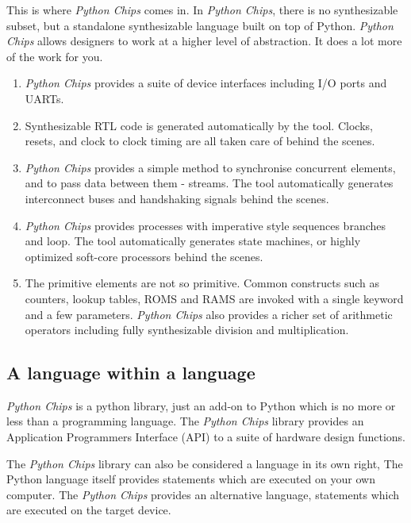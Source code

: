 \documentclass[letterpaper,10pt,english]{manual}
\begin{document}
This is where \emph{Python Chips} comes in. In \emph{Python Chips}, there is no
synthesizable subset, but a standalone synthesizable language built on top
of Python. \emph{Python Chips} allows designers to work at a higher level of
abstraction. It does a lot more of the work for you.
\begin{enumerate}
\item {} 
\emph{Python Chips} provides a suite of device interfaces including
I/O ports and UARTs.

\item {} 
Synthesizable RTL code is generated automatically by the tool.
Clocks, resets, and clock to clock timing are all taken care of
behind the scenes.

\item {} 
\emph{Python Chips} provides a simple method to synchronise concurrent
elements, and to pass data between them - streams. The tool
automatically generates interconnect buses and handshaking
signals behind the scenes.

\item {} 
\emph{Python Chips} provides processes with imperative style
sequences branches and loop. The tool automatically generates
state machines, or highly optimized soft-core processors behind
the scenes.

\item {} 
The primitive elements are not so primitive. Common constructs
such as counters, lookup tables, ROMS and RAMS are invoked with a
single keyword and a few parameters. \emph{Python Chips} also provides
a richer set of arithmetic operators including fully
synthesizable division and multiplication.

\end{enumerate}


\subsection{A language within a language}

\emph{Python Chips} is a python library, just an add-on to Python which is no
more or less than a programming language. The \emph{Python Chips} library
provides an Application Programmers Interface (API) to a suite of hardware
design functions.

The \emph{Python Chips} library can also be considered a language in its own
right, The Python language itself provides statements which are executed on
your own computer. The \emph{Python Chips} provides an alternative language,
statements which are executed on the target device.
\end{document}
